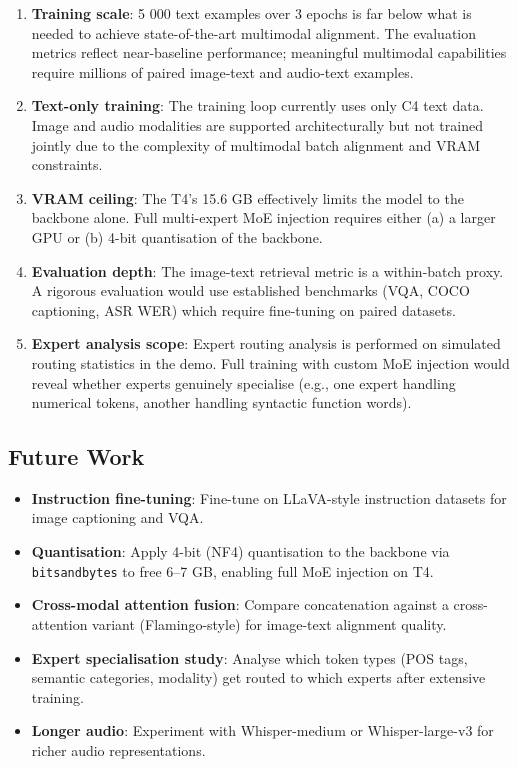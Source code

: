 \documentclass[11pt]{article}
\begin{document}
\begin{enumerate}[leftmargin=*]
\item \textbf{Training scale}: 5 000 text examples over 3 epochs is far below what is needed to achieve state-of-the-art multimodal alignment. The evaluation metrics reflect near-baseline performance; meaningful multimodal capabilities require millions of paired image-text and audio-text examples.

\item \textbf{Text-only training}: The training loop currently uses only C4 text data. Image and audio modalities are supported architecturally but not trained jointly due to the complexity of multimodal batch alignment and VRAM constraints.

\item \textbf{VRAM ceiling}: The T4's 15.6 GB effectively limits the model to the backbone alone. Full multi-expert MoE injection requires either (a) a larger GPU or (b) 4-bit quantisation of the backbone.

\item \textbf{Evaluation depth}: The image-text retrieval metric is a within-batch proxy. A rigorous evaluation would use established benchmarks (VQA, COCO captioning, ASR WER) which require fine-tuning on paired datasets.

\item \textbf{Expert analysis scope}: Expert routing analysis is performed on simulated routing statistics in the demo. Full training with custom MoE injection would reveal whether experts genuinely specialise (e.g., one expert handling numerical tokens, another handling syntactic function words).

\end{enumerate}
\subsection{Future Work}


\begin{itemize}[leftmargin=*]
\item \textbf{Instruction fine-tuning}: Fine-tune on LLaVA-style instruction datasets for image captioning and VQA.
\item \textbf{Quantisation}: Apply 4-bit (NF4) quantisation to the backbone via \texttt{bitsandbytes} to free 6–7 GB, enabling full MoE injection on T4.
\item \textbf{Cross-modal attention fusion}: Compare concatenation against a cross-attention variant (Flamingo-style) for image-text alignment quality.
\item \textbf{Expert specialisation study}: Analyse which token types (POS tags, semantic categories, modality) get routed to which experts after extensive training.
\item \textbf{Longer audio}: Experiment with Whisper-medium or Whisper-large-v3 for richer audio representations.

\end{itemize}
\end{document}
